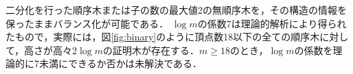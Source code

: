 二分化を行った順序木\cite{miyano-parallel1993}または子の数の最大値2の無順序木を，その構造の情報を保ったままバランス化が可能である．
%
$\log m$の係数7は理論的解析により得られたもので，実際には，図\ref{fig:binary}のように頂点数18以下の全ての順序木に対して，高さが高々2$\log m$の証明木が存在する．$m\geq 18$のとき，$\log m$の係数を理論的に7未満にできるか否かは未解決である．

